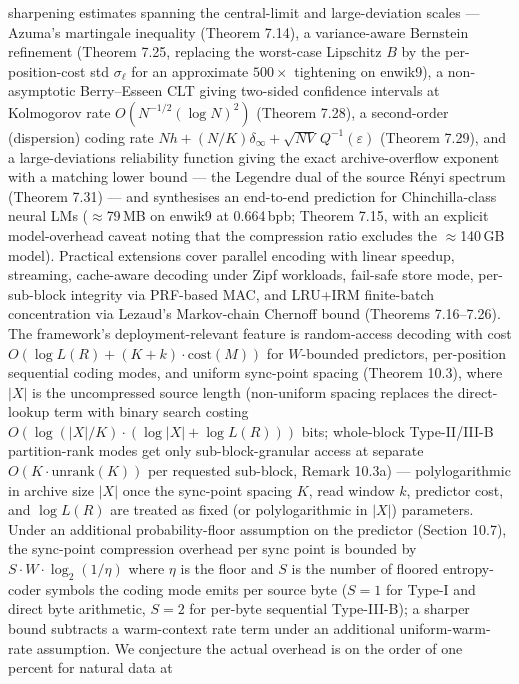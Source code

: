 \documentclass[
]{article}
\begin{document}
sharpening estimates spanning the central-limit and large-deviation
scales --- Azuma's martingale inequality
(Theorem 7.14), a variance-aware Bernstein refinement (Theorem 7.25,
replacing the worst-case Lipschitz $B$ by the per-position-cost std
$\sigma_\ell$ for an approximate $500\times$ tightening on enwik9),
a non-asymptotic Berry--Esseen CLT giving two-sided confidence
intervals at Kolmogorov rate $O(N^{-1/2}(\log N)^2)$ (Theorem 7.28),
a second-order (dispersion) coding rate
$Nh+(N/K)\delta_\infty+\sqrt{NV}\,Q^{-1}(\varepsilon)$ (Theorem 7.29),
and a large-deviations reliability function giving the exact
archive-overflow exponent with a matching lower bound --- the Legendre
dual of the source R\'enyi spectrum (Theorem 7.31) --- and
synthesises an end-to-end prediction for Chinchilla-class neural
LMs ($\approx$79\,MB on enwik9 at 0.664\,bpb; Theorem 7.15, with
an explicit model-overhead caveat noting that the compression
ratio excludes the $\approx$140\,GB model).
Practical extensions cover parallel encoding with linear speedup,
streaming, cache-aware decoding under Zipf workloads, fail-safe
store mode, per-sub-block integrity via PRF-based MAC, and
LRU+IRM finite-batch concentration via Lezaud's Markov-chain
Chernoff bound (Theorems 7.16--7.26). The framework's deployment-relevant feature is random-access decoding
with cost
$O(\log L(R) + (K + k) \cdot \mathrm{cost}(M))$ for
$W$-bounded predictors, per-position sequential coding modes, and
uniform sync-point spacing (Theorem 10.3), where $|X|$ is the
uncompressed source length (non-uniform spacing replaces the
direct-lookup term with binary search costing
$O(\log(|X|/K) \cdot (\log |X| + \log L(R)))$ bits;
whole-block Type-II/III-B partition-rank modes get only
sub-block-granular access at separate $O(K \cdot \mathrm{unrank}(K))$
per requested sub-block, Remark 10.3a) --- polylogarithmic in
archive size $|X|$ once the sync-point spacing $K$, read window
$k$, predictor cost, and $\log L(R)$ are treated as fixed (or
polylogarithmic in $|X|$) parameters. Under an additional probability-floor assumption
on the predictor (Section 10.7), the sync-point compression overhead
per sync point is bounded by $S \cdot W \cdot \log_2(1/\eta)$ where
$\eta$ is the floor and $S$ is the number of floored entropy-coder
symbols the coding mode emits per source byte ($S = 1$ for Type-I
and direct byte arithmetic, $S = 2$ for per-byte sequential
Type-III-B); a sharper bound subtracts a warm-context rate term
under an additional uniform-warm-rate assumption. We conjecture
the actual overhead is on the order of one percent for natural data at
\end{document}

